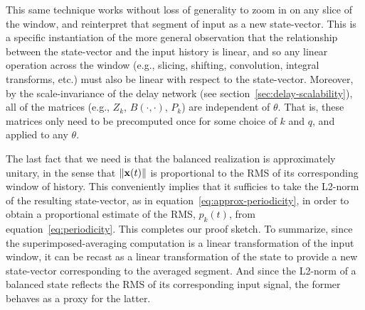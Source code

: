 This same technique works without loss of generality to zoom in on any slice of the window, and reinterpret that segment of input as a new state-vector. This is a specific instantiation of the more general observation that the relationship between the state-vector and the input history is linear, and so any linear operation across the window (e.g., slicing, shifting, convolution, integral transforms, etc.) must also be linear with respect to the state-vector.
Moreover, by the scale-invariance of the delay network (see section~\ref{sec:delay-scalability}), all of the matrices (e.g., $Z_k$, $B(\cdot, \cdot)$, $P_k$) are independent of $\theta$. That is, these matrices only need to be precomputed once for some choice of $k$ and $q$, and applied to any $\theta$.

The last fact that we need is that the balanced realization is approximately unitary, in the sense that $\| \mathbf{x}(t) \|$ is proportional to the RMS of its corresponding window of history.
This conveniently implies that it sufficies to take the L2-norm of the resulting state-vector, as in equation~\ref{eq:approx-periodicity}, in order to obtain a proportional estimate of the RMS, $p_k(t)$, from equation~\ref{eq:periodicity}.
This completes our proof sketch.
To summarize, since the superimposed-averaging computation is a linear transformation of the input window, it can be recast as a linear transformation of the state to provide a new state-vector corresponding to the averaged segment.
And since the L2-norm of a balanced state reflects the RMS of its corresponding input signal, the former behaves as a proxy for the latter.


